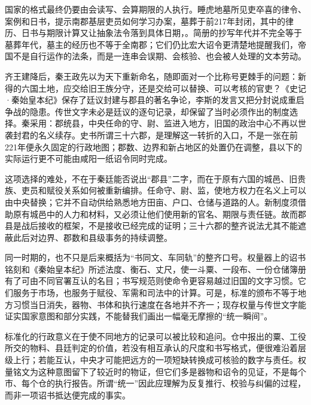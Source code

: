 国家的格式最终仍要由会读写、会算期限的人执行。睡虎地墓所见吏卒喜的律令、案例和日书，提示南郡基层吏员如何学习办案，墓葬于前217年封闭，其中的律历、日书与期限计算又让抽象法令落到具体日期，。简册的抄写年代并不完全等于墓葬年代，墓主的经历也不等于全南郡；它们仍比宏大诏令更清楚地提醒我们，帝国不是自行运作的法条，而是一连串会误期、会核验、也会被人处理的文本劳动。

齐王建降后，秦王政先以为天下重新命名，随即面对一个比称号更棘手的问题：新得的六国土地，应交给旧王族分守，还是交给可以替换、可以考核的官吏？《史记·秦始皇本纪》保存了廷议封建与郡县的著名争论，李斯的发言又把分封说成重启争战的隐患。传世文字未必是廷议的逐句记录，却保留了当时必须作出的制度选择。秦采用：郡统县，中央任命的守、尉、监进入地方，旧国的政治中心不再以世袭封君的名义续存。史书所谓三十六郡，是理解这一转折的入口，不是一张在前221年便永久固定的行政地图；郡数、边界和新占地区的处置仍在调整，县以下的实际运行更不可能由咸阳一纸诏令同时完成。

这项选择的难处，不在于秦廷能否说出“郡县”二字，而在于原有六国的城邑、旧贵族、吏员和赋役关系如何被重新编排。任命守、尉、监，使地方权力在名义上可以由中央替换；它并不自动供给熟悉地方田亩、户口、仓储与道路的人。新制度须借助原有城邑中的人力和材料，又必须让他们使用新的官名、期限与责任链。故而郡县是战后接收的框架，不是接收已经完成的证明；三十六郡的整齐说法尤其不能遮蔽此后对边界、郡数和县级事务的持续调整。

同一时期的，也不只是后来概括为“书同文、车同轨”的整齐口号。权量器上的诏书铭刻和《秦始皇本纪》所述法度、衡石、丈尺，使一斗粟、一段布、一份仓储簿册有了可由不同官署互认的名目；书写规范则使命令更容易越过旧国的文字习惯。它们服务于市场，也服务于赋役、军需和司法中的计算。可是，标准的颁布不等于地方习惯当日消失，器物、书体和执行速度在各地并不齐一；现存权量与传世文字能证实国家意图和部分实践，不能替我们画出一幅毫无摩擦的“统一瞬间”。

标准化的行政意义在于使不同地方的记录可以被比较和追问。仓中报出的粟、工役所交的物料、县廷判定的价值，若没有相互承认的尺度和书写格式，便很难沿着层级上行；若能互认，中央才可能把远方的一项短缺转换成可核验的数字与责任。权量铭文为这种意图留下了较近时的物证，但它们多是器物和诏令的见证，不是每个市、每个仓的执行报告。所谓“统一”因此应理解为反复推行、校验与纠偏的过程，而非一项诏书抵达便完成的事实。

